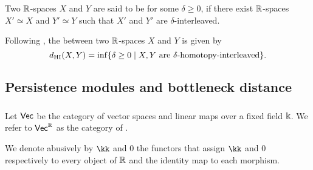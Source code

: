\subsubsection{}\label{def:dhi}

Two $\R$-spaces $X$ and $Y$ are said to be  for some $\delta \geq 0$, if there exist $\R$-spaces $X' \simeq X$ and $Y' \simeq Y$ such that $X'$ and $Y'$ are $\delta$-interleaved.

Following \cite{blumberg2023interleaving}, the  between two $\R$-spaces $X$ and $Y$ is given by
\[
\dhi(X,Y) = \inf \set{\delta \geq 0 \mid X,Y \text{ are }\delta\text{-homotopy-interleaved}}.
\]

\subsection{Persistence modules and bottleneck distance}

\subsubsection{}

Let $\Vec$ be the category of vector spaces and linear maps over a fixed field $\k$.
We refer to $\Vec^\R$ as the category of .


We denote abusively by $\kk$ and $0$ the functors that assign $\kk$ and $0$ respectively to every object of $\R$ and the identity map to each morphism.

